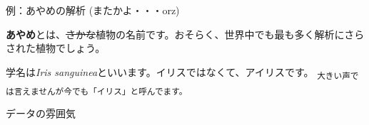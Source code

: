 \begin{frame}[fragile]{例：あやめの解析 (またかよ・・・orz)}

\textbf{あやめ}とは、\sout{さかな}植物の名前です。おそらく、世界中でも最も多く解析にさらされた植物でしょう。

学名は\emph{Iris sanguinea}といいます。イリスではなくて、アイリスです。
\textsubscript{大きい声では言えませんが今でも「イリス」と呼んでます。}

\begin{block}{データの雰囲気}

\begin{Shaded}
\begin{Highlighting}[]
\NormalTok{(}\NormalTok{, } \NormalTok{)}
\end{Highlighting}
\end{Shaded}


\end{block}
\end{frame}
